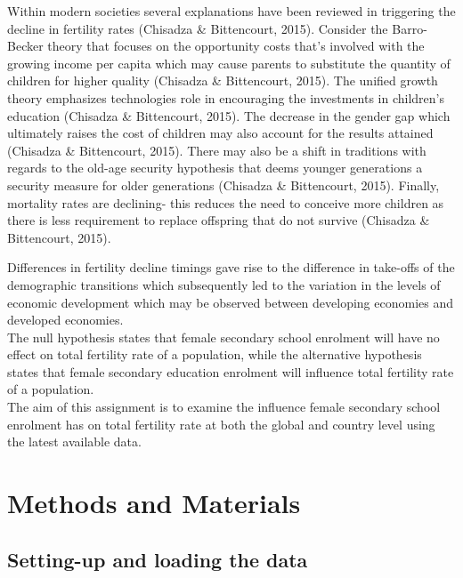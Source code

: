 \documentclass[11pt,]{article}
\begin{document}
Within modern societies several explanations have been reviewed in
triggering the decline in fertility rates (Chisadza \& Bittencourt,
2015). Consider the Barro-Becker theory that focuses on the opportunity
costs that's involved with the growing income per capita which may cause
parents to substitute the quantity of children for higher quality
(Chisadza \& Bittencourt, 2015). The unified growth theory emphasizes
technologies role in encouraging the investments in children's education
(Chisadza \& Bittencourt, 2015). The decrease in the gender gap which
ultimately raises the cost of children may also account for the results
attained (Chisadza \& Bittencourt, 2015). There may also be a shift in
traditions with regards to the old-age security hypothesis that deems
younger generations a security measure for older generations (Chisadza
\& Bittencourt, 2015). Finally, mortality rates are declining- this
reduces the need to conceive more children as there is less requirement
to replace offspring that do not survive (Chisadza \& Bittencourt,
2015).

Differences in fertility decline timings gave rise to the difference in
take-offs of the demographic transitions which subsequently led to the
variation in the levels of economic development which may be observed
between developing economies and developed economies.\\
The null hypothesis states that female secondary school enrolment will
have no effect on total fertility rate of a population, while the
alternative hypothesis states that female secondary education enrolment
will influence total fertility rate of a population.\\
The aim of this assignment is to examine the influence female secondary
school enrolment has on total fertility rate at both the global and
country level using the latest available data.

\section{Methods and Materials}\label{methods-and-materials}

\subsection{Setting-up and loading the
data}\label{setting-up-and-loading-the-data}
\end{document}
